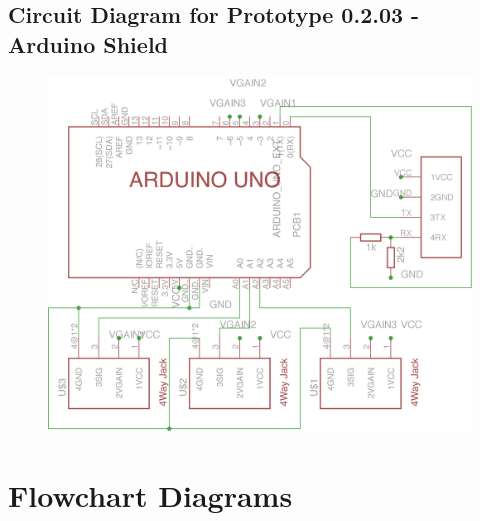 \subsection{Circuit Diagram for Prototype 0.2.03 - Arduino Shield}
\label{ardshieldsch}
\begin{figure}[H]
\centering
\includegraphics[scale = 1]{Images/ard_schematic_01}
\end{figure}



\section{Flowchart Diagrams} \label{Flow Diagrams}


